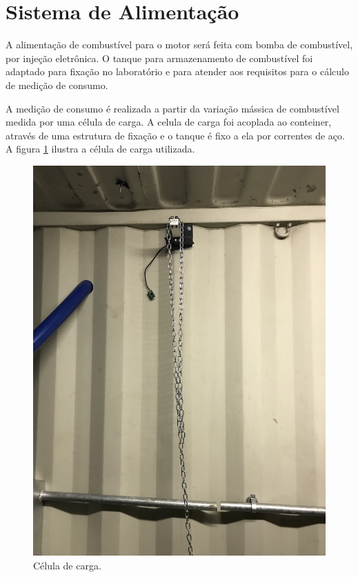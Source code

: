 	
\section{Sistema de Alimentação}

A alimentação de combustível para o motor será feita com bomba de combustível, por injeção eletrônica. O tanque para armazenamento de combustível foi adaptado para fixação no laboratório e para atender aos requisitos para o cálculo de medição de consumo.

A medição de consumo é realizada a partir da variação mássica de combustível medida por uma célula de carga. A celula de carga foi acoplada ao conteiner, através de uma estrutura de fixação e o tanque é fixo a ela por correntes de aço. A figura \ref{celulaDeCarga} ilustra a célula de carga utilizada. 

\begin{figure}[h!]
	\centering
	\includegraphics[keepaspectratio=true,scale= 0.07]{figuras/celulaDeCarga.JPG}
	\caption{Célula de carga.}
	\label{celulaDeCarga}
\end{figure}

